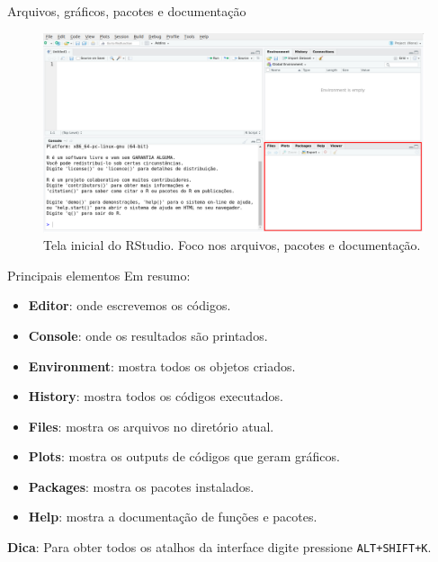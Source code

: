 \documentclass[
  ignorenonframetext,
  serif,
  professionalfont,
  usenames,
  dvipsnames,
  aspectratio = 169]{beamer}
\providecommand{\tightlist}{%
  \setlength{\itemsep}{0pt}\setlength{\parskip}{0pt}}
\renewcommand{\tightlist}{%
  \setlength{\itemsep}{0\baselineskip}
  \setlength{\parskip}{0.25\baselineskip}
}
\begin{document}
\begin{frame}{Arquivos, gráficos, pacotes e documentação}
\label{arquivos-gruxe1ficos-pacotes-e-documentauxe7uxe3o}
\begin{figure}

{\centering \includegraphics[width=0.85\linewidth]{./img/files} 

}

\caption{Tela inicial do RStudio. Foco nos arquivos, pacotes e documentação.}\label{fig:unnamed-chunk-15}
\end{figure}
\end{frame}

\begin{frame}[fragile]{Principais elementos}
\label{principais-elementos}
Em resumo:

\begin{itemize}
\tightlist
\item
  \textbf{Editor}: onde escrevemos os códigos.
\item
  \textbf{Console}: onde os resultados são printados.
\item
  \textbf{Environment}: mostra todos os objetos criados.
\item
  \textbf{History}: mostra todos os códigos executados.
\item
  \textbf{Files}: mostra os arquivos no diretório atual.
\item
  \textbf{Plots}: mostra os outputs de códigos que geram gráficos.
\item
  \textbf{Packages}: mostra os pacotes instalados.
\item
  \textbf{Help}: mostra a documentação de funções e pacotes.
\end{itemize}

\textbf{Dica}: Para obter todos os atalhos da interface digite pressione
\texttt{ALT+SHIFT+K}.
\end{frame}
\end{document}
